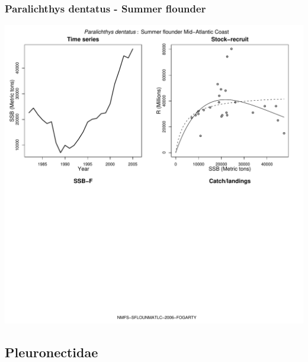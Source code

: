 \subsubsection{Paralichthys dentatus - Summer flounder}
\begin{center}
\includegraphics[width=1.2\textwidth]{../R/figures/NMFS-SFLOUNMATLC-2006-FOGARTY.pdf}
\end{center}

\subsection{Pleuronectidae}

